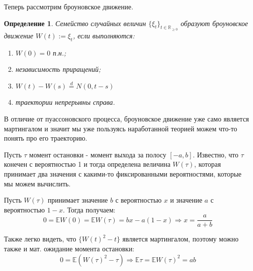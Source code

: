 \documentclass[12pt,a4paper]{article} %
\newtheorem{definition}{Определение}
\newcommand{\R}{\mathbb{R}}
\newcommand{\E}{\mathbb{E}}
\begin{document}
	Теперь рассмотрим броуновское движение.
	\begin{definition}
		Семейство случайных величин $\{\xi_t\}_{t\in\R_{\geq0}}$ образуют броуновское движение $W(t):=\xi_t$, если выполняются:
		\begin{enumerate}
			\item $W(0)=0$ п.н.;
			\item независимость приращений;
			\item $W(t)-W(s)\overset{d}{=}N(0,t-s)$
			\item траектории непрерывны справа.
		\end{enumerate}
	\end{definition}
	В отличие от пуассоновского процесса, броуновское движение уже само является мартингалом и значит мы уже пользуясь наработанной теорией можем что-то понять про его траекторию.
	
	Пусть $\tau$ момент остановки - момент выхода за полосу $[-a,b]$. Известно, что $\tau$ конечен с вероятностью 1 и тогда определена величина $W(\tau)$, которая принимает два значения с какими-то фиксированными вероятностями, которые мы можем вычислить.
	
	Пусть $W(\tau)$ принимает значение $b$ с вероятностью $x$ и значение $a$ с вероятностью $1-x$. Тогда получаем:
	$$0=\E W(0)=\E W(\tau)=bx-a(1-x)\Rightarrow x=\frac{a}{a+b}$$
	
	Также легко видеть, что $\{W(t)^2-t\}$ является мартингалом, поэтому можно также и мат. ожидание момента остановки:
	$$0=\E(W(\tau)^2-\tau)\Rightarrow \E\tau=\E W(\tau)^2=ab$$
	\clearpage
\end{document}
